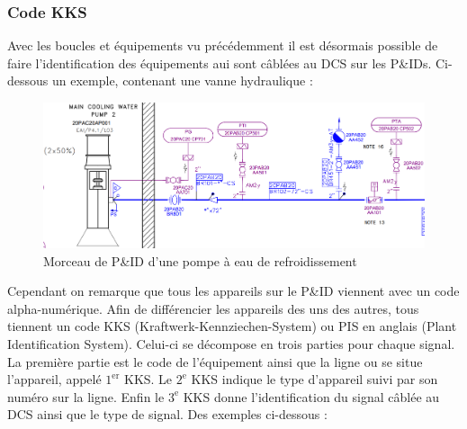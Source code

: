 \documentclass[11pt, openright]{book}
\begin{document}
\newpage

\subsubsection{Code KKS}

Avec les boucles et équipements vu précédemment il est désormais possible de faire l'identifica\-tion des équipements aui sont câblées au DCS sur les P\&IDs. Ci-dessous un exemple, contenant une vanne hydraulique :



\begin{figure}[ht!]
    \centering
    \includegraphics[width=\textwidth]{./object/PID.png}
    \caption{Morceau de P\&ID d'une pompe à eau de refroidissement}
    \label{fig:PID}
\end{figure}

Cependant on remarque que tous les appareils sur le P\&ID viennent avec un code alpha-numér\-ique. Afin de différencier les appareils des uns des autres, tous tiennent un code KKS (Kraftwerk-Kennziechen-System) ou PIS en anglais (Plant Identification System). Celui-ci se décompose en trois parties pour chaque signal. La première partie est le code de l'équipement ainsi que la ligne ou se situe l'appareil, appelé $1^{\text{er}}$ KKS. Le $2^{\text{e}}$ KKS indique le type d'appareil suivi par son numéro sur la ligne. Enfin le $3^{\text{e}}$ KKS donne l'identification du signal câblée au DCS ainsi que le type de signal. Des exemples ci-dessous :
\end{document}
